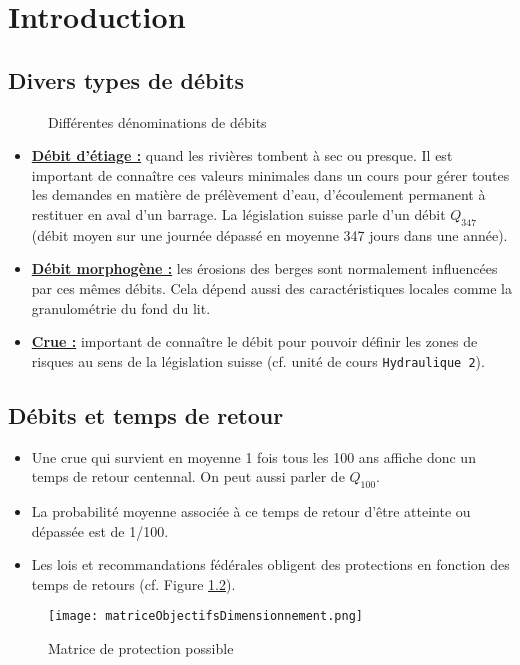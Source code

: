 \chapter{Introduction}

\section{Divers types de débits}
\begin{figure}[H]
    \centering
    \caption{Différentes dénominations de débits}
    \label{fig:debits}
\end{figure}

\begin{itemize}
    \item \underline{\textbf{Débit d'étiage :}} quand les rivières tombent à sec ou presque.
    Il est important de connaître ces valeurs minimales dans un cours pour gérer toutes les demandes en matière de prélèvement d'eau, d'écoulement permanent à restituer en aval d'un barrage.
    La législation suisse parle d'un débit $Q_{347}$ (débit moyen sur une journée dépassé en moyenne 347 jours dans une année).
    \item \underline{\textbf{Débit morphogène :}} les érosions des berges sont normalement influencées par ces mêmes débits. Cela dépend aussi des caractéristiques locales comme la granulométrie du fond du lit.
    \item \underline{\textbf{Crue :}} important de connaître le débit pour pouvoir définir les zones de risques au sens de la législation suisse (cf. unité de cours \texttt{Hydraulique 2}).
\end{itemize}

\section{Débits et temps de retour}
\begin{itemize}
    \item Une crue qui survient en moyenne 1 fois tous les 100 ans affiche donc un temps de retour centennal.
    On peut aussi parler de $Q_{100}$.
    \item La probabilité moyenne associée à ce temps de retour d'être atteinte ou dépassée est de 1/100.
    \item Les lois et recommandations fédérales obligent des protections en fonction des temps de retours (cf. Figure \ref{fig:matriceProtection}).
\end{itemize}
\begin{figure}[h!]
    \centering
    \texttt{[image: matriceObjectifsDimensionnement.png]}
    \caption{Matrice de protection possible}
    \label{fig:matriceProtection}
\end{figure}

